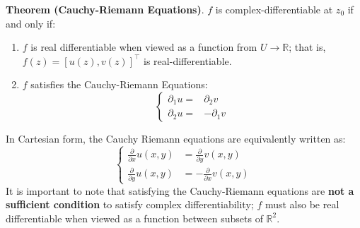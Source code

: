 \textbf{Theorem (Cauchy-Riemann Equations)}. $f$ is complex-differentiable at $z_0$ if and only if: \begin{enumerate}
    \item[1.] $f$ is real differentiable when viewed as a function from $U\to\mathbb{R}$; that is, $f(z) = [u(z), v(z)]^\top$ is real-differentiable.
    \item[2.] $f$ satisfies the Cauchy-Riemann Equations: \[\begin{cases}
        \partial_1 u =& \partial_2 v\\
        \partial_2 u =&-\partial_1 v
    \end{cases}\]
\end{enumerate} In Cartesian form, the Cauchy Riemann equations are equivalently written as: \[\begin{cases}
    \displaystyle\frac{\partial}{\partial x}u(x,y) &= \displaystyle\frac{\partial}{\partial y}v(x,y)\\
    \displaystyle\frac{\partial}{\partial y} u(x,y) &= -\displaystyle\frac{\partial}{\partial x}v(x,y)
\end{cases}\] It is important to note that satisfying the Cauchy-Riemann equations are \textbf{not a sufficient condition} to satisfy complex differentiability; $f$ must also be real differentiable when viewed as a function between subsets of $\mathbb{R}^2$.

